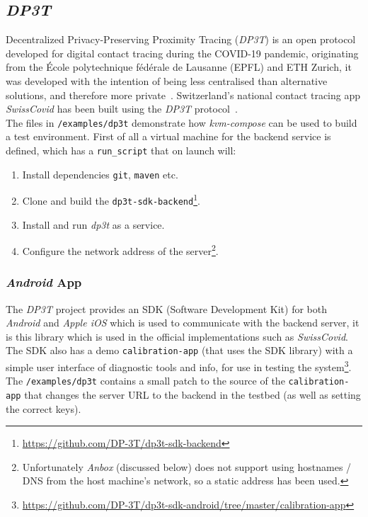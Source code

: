 \documentclass[
    author={Jacob Daniel Halsey},
    supervisor={Prof. Awais Rashid},
    degree={BSc},
    title={Building a Testbed for Evaluating Privacy Enhancing Technologies  (PETs)},
    subtitle={},
    type={software development},
    year={2021}
]{dissertation}
\begin{document}
\subsection{\emph{DP3T}}

Decentralized Privacy-Preserving Proximity Tracing (\emph{DP3T}) is an open protocol developed for
digital contact tracing during the COVID-19 pandemic, originating from the École polytechnique fédérale 
de Lausanne (EPFL) and ETH Zurich, it was developed with the intention of being less centralised
than alternative solutions, and therefore more private~\cite{busvine_2020}. 
Switzerland's national contact tracing app \emph{SwissCovid} 
has been built using the \emph{DP3T} protocol~\cite{swisscovid}. \\

The files in \texttt{/examples/dp3t} demonstrate how \emph{kvm-compose} can be used to build
a test environment. First of all a virtual machine for the backend service is defined,
which has a \texttt{run\_script} that on launch will:

\begin{singlespace}
	\begin{enumerate}
		\item Install dependencies \texttt{git}, \texttt{maven} etc.
		\item Clone and build the 
		\texttt{dp3t-sdk-backend}\footnote{\url{https://github.com/DP-3T/dp3t-sdk-backend}}.
		\item Install and run \emph{dp3t} as a service.
		\item Configure the network address of the server\footnote{
			Unfortunately \emph{Anbox} (discussed below) does not support using hostnames / DNS from 
			the host machine's network, so a static address has been used.}.
	\end{enumerate}
\end{singlespace}

\subsubsection{\emph{Android} App}

The \emph{DP3T} project provides an SDK (Software Development Kit) 
for both \emph{Android} and \emph{Apple iOS} which
is used to communicate with the backend server, it is this library which is used in the official
implementations such as \emph{SwissCovid}. The SDK also has a demo \texttt{calibration-app} (that uses
the SDK library) with a simple user interface of diagnostic tools and info, for use in testing the 
system\footnote{\url{https://github.com/DP-3T/dp3t-sdk-android/tree/master/calibration-app}}.
The \texttt{/examples/dp3t} contains a small patch to the source of the \texttt{calibration-app} that
changes the server URL to the backend in the testbed (as well as setting the correct keys). \\
\end{document}

